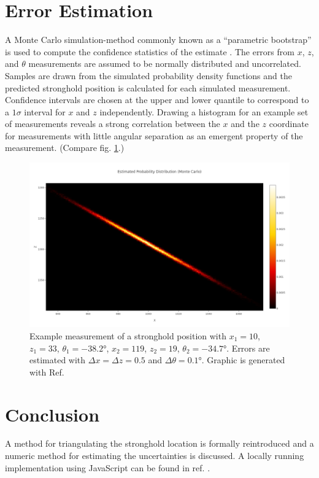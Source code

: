 \documentclass[a4paper,10pt]{article}
\begin{document}
\begin{multicols}{2}
    \section{Error Estimation}

    A Monte Carlo simulation-method commonly known as a \enquote{parametric bootstrap} is used to compute the confidence statistics of the estimate \cite[53-56]{efron_1994_introductiontothebootstap}.
    The errors from $x$, $z$, and $\theta$ measurements are assumed to be normally distributed and uncorrelated. Samples are drawn from the simulated probability density functions and the predicted stronghold position is calculated for each simulated measurement.
    Confidence intervals are chosen at the upper and lower quantile to correspond to a $1\sigma$ interval for $x$ and $z$ independently.
    Drawing a histogram for an example set of measurements reveals a strong correlation between the $x$ and the $z$ coordinate for measurements with little angular separation as an emergent property of the measurement. (Compare fig. \ref{fig:histo}.) 

    \begin{figure}[H]
        \centering
        \includegraphics[width = \linewidth]{img/distribution_large.png}
        \caption{Example measurement of a stronghold position with $x_1 = 10$, $z_1 = 33$, $\theta_1 = -38.2\unit{\degree}$, $x_2 = 119$, $z_2 = 19$, $\theta_2 = -34.7\unit\degree$. Errors are estimated with $\Delta x = \Delta z = 0.5$ and $\Delta \theta = 0.1\unit\degree$. Graphic is generated with Ref. \cite{repo_triang}}
        \label{fig:histo}
    \end{figure}

    \section{Conclusion}

    A method for triangulating the stronghold location is formally reintroduced and a numeric method for estimating the uncertainties is discussed. A locally running implementation using JavaScript can be found in ref. \cite{repo_triang}.
\end{multicols}

\printbibliography
\end{document}

